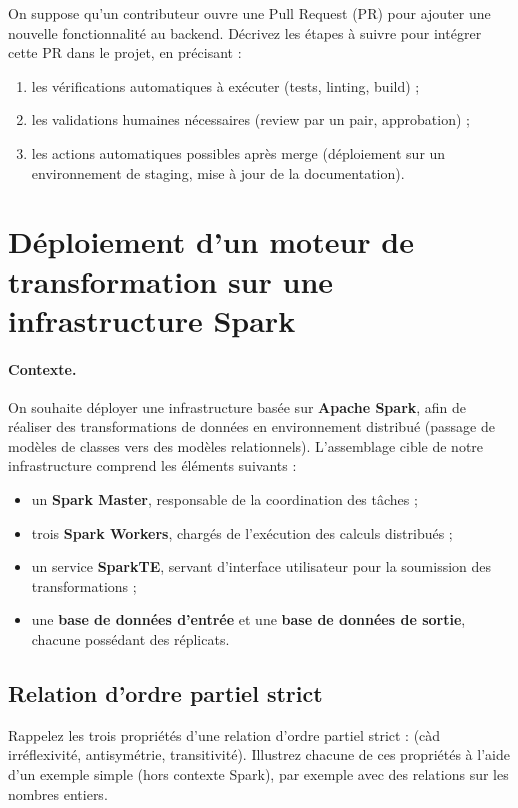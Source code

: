 \documentclass{article}%
\begin{document}
On suppose qu’un contributeur ouvre une Pull Request (PR) pour ajouter une nouvelle fonctionnalité au backend.  
Décrivez les étapes à suivre pour intégrer cette PR dans le projet, en précisant :
\begin{enumerate}
  \item les vérifications automatiques à exécuter (tests, linting, build) ;
  \item les validations humaines nécessaires (review par un pair, approbation) ;
  \item les actions automatiques possibles après merge (déploiement sur un environnement de staging, mise à jour de la documentation).
\end{enumerate}


\section{Déploiement d'un moteur de transformation sur une infrastructure Spark}

\paragraph{Contexte.}  
On souhaite déployer une infrastructure basée sur \textbf{Apache Spark}, afin de réaliser des transformations de données en environnement distribué (passage de modèles de classes vers des modèles relationnels).  
L'assemblage cible de notre infrastructure comprend les éléments suivants :
\begin{itemize}
  \item un \textbf{Spark Master}, responsable de la coordination des tâches ;
  \item trois \textbf{Spark Workers}, chargés de l'exécution des calculs distribués ;
  \item un service \textbf{SparkTE}, servant d'interface utilisateur pour la soumission des transformations ;
  \item une \textbf{base de données d’entrée} et une \textbf{base de données de sortie}, chacune possédant des réplicats.
\end{itemize}

\subsection{Relation d’ordre partiel strict}

Rappelez les trois propriétés d'une relation d’ordre partiel strict :
(càd irréflexivité, antisymétrie, transitivité).
Illustrez chacune de ces propriétés à l’aide d’un exemple simple (hors contexte Spark), par exemple avec des relations sur les nombres entiers.
\end{document}
